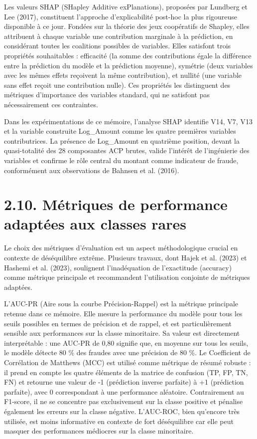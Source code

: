 Les valeurs SHAP (SHapley Additive exPlanations), proposées par Lundberg et Lee (2017), constituent l'approche d'explicabilité post-hoc la plus rigoureuse disponible à ce jour. Fondées sur la théorie des jeux coopératifs de Shapley, elles attribuent à chaque variable une contribution marginale à la prédiction, en considérant toutes les coalitions possibles de variables. Elles satisfont trois propriétés souhaitables : efficacité (la somme des contributions égale la différence entre la prédiction du modèle et la prédiction moyenne), symétrie (deux variables avec les mêmes effets reçoivent la même contribution), et nullité (une variable sans effet reçoit une contribution nulle). Ces propriétés les distinguent des métriques d'importance des variables standard, qui ne satisfont pas nécessairement ces contraintes.

Dans les expérimentations de ce mémoire, l'analyse SHAP identifie V14, V7, V13 et la variable construite Log\_Amount comme les quatre premières variables contributrices. La présence de Log\_Amount en quatrième position, devant la quasi-totalité des 28 composantes ACP brutes, valide l'intérêt de l'ingénierie des variables et confirme le rôle central du montant comme indicateur de fraude, conformément aux observations de Bahnsen et al. (2016).

\section{2.10. Métriques de performance adaptées aux classes rares}

Le choix des métriques d'évaluation est un aspect méthodologique crucial en contexte de déséquilibre extrême. Plusieurs travaux, dont Hajek et al. (2023) et Hashemi et al. (2023), soulignent l'inadéquation de l'exactitude (accuracy) comme métrique principale et recommandent l'utilisation conjointe de métriques adaptées.

L'AUC-PR (Aire sous la courbe Précision-Rappel) est la métrique principale retenue dans ce mémoire. Elle mesure la performance du modèle pour tous les seuils possibles en termes de précision et de rappel, et est particulièrement sensible aux performances sur la classe minoritaire. Sa valeur est directement interprétable : une AUC-PR de 0,80 signifie que, en moyenne sur tous les seuils, le modèle détecte 80 \% des fraudes avec une précision de 80 \%. Le Coefficient de Corrélation de Matthews (MCC) est utilisé comme métrique de résumé robuste : il prend en compte les quatre éléments de la matrice de confusion (TP, FP, TN, FN) et retourne une valeur de -1 (prédiction inverse parfaite) à +1 (prédiction parfaite), avec 0 correspondant à une performance aléatoire. Contrairement au F1-score, il ne se concentre pas exclusivement sur la classe positive et pénalise également les erreurs sur la classe négative. L'AUC-ROC, bien qu'encore très utilisée, est moins informative en contexte de fort déséquilibre car elle peut masquer des performances médiocres sur la classe minoritaire.

